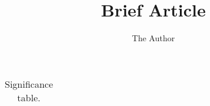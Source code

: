 \documentclass[4pt]{article}
\title{Brief Article}
\author{The Author}
\begin{document}

\begin{landscape}
\begin{table}[hbtp]
   \centering
   \caption{Significance table.}
   \begin{tabular}{lllllll } %
     
   \end{tabular}

   \label{tab:booktabs}
\end{table}
\end{landscape}
\end{document}
